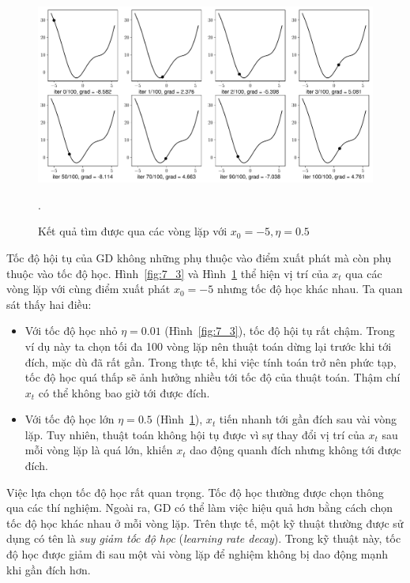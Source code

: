 \begin{figure}[t]
\centering
    \includegraphics[width =
    .975\textwidth]{ebookML_src/src/grad_descent/gd1d_2.pdf}
    \caption[]{Kết quả tìm được qua các vòng lặp với $x_0 = -5, \eta = 0.5$}.
    \label{fig:7_4}
\end{figure}



Tốc độ hội tụ của GD không những phụ thuộc vào điểm xuất phát mà còn phụ
thuộc vào tốc độ học. Hình~\ref{fig:7_3} và Hình~\ref{fig:7_4} thể
hiện vị trí của $x_t$ qua các vòng lặp với cùng điểm xuất phát $x_{0} = -5$
nhưng tốc độ học khác nhau. Ta quan sát thấy hai điều: 
\begin{itemize}
    \item Với tốc độ học nhỏ $\eta = 0.01$ (Hình~\ref{fig:7_3}), tốc độ
    hội tụ rất chậm. Trong ví dụ này ta chọn tối đa 100 vòng lặp nên thuật toán
    dừng lại trước khi tới {đích}, mặc dù đã rất gần. Trong thực tế, khi việc
    tính toán trở nên phức tạp, tốc độ học quá thấp sẽ ảnh hưởng nhiều tới tốc
    độ của thuật toán. Thậm chí $x_t$ có thể không bao giờ tới được đích.

    \item Với tốc độ học lớn $\eta = 0.5$ (Hình~\ref{fig:7_4}),
    $x_t$ tiến nhanh tới {gần đích} sau vài vòng lặp. Tuy nhiên,
    thuật toán không hội tụ được vì sự thay đổi vị trí của $x_t$ sau mỗi vòng
    lặp là quá lớn, khiến $x_t$ dao động quanh đích nhưng không tới được đích. 

\end{itemize}
Việc lựa chọn tốc độ học rất quan trọng. Tốc độ học thường được chọn thông qua
các thí nghiệm. Ngoài ra, GD có thể làm việc hiệu quả hơn bằng cách chọn tốc độ
học khác nhau ở mỗi vòng lặp. Trên thực tế, một kỹ thuật thường được sử dụng có
tên là \textit{suy giảm tốc độ học} (\textit{learning rate decay}). Trong kỹ
thuật này, tốc độ học được giảm đi sau một vài vòng lặp để nghiệm không bị dao
động mạnh khi gần đích hơn.
 

